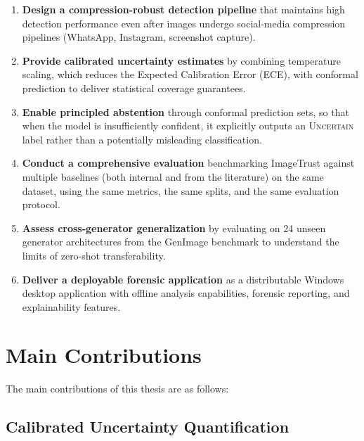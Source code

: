 \begin{enumerate}
    \item \textbf{Design a compression-robust detection pipeline} that maintains high detection performance even after images undergo social-media compression pipelines (WhatsApp, Instagram, screenshot capture).

    \item \textbf{Provide calibrated uncertainty estimates} by combining temperature scaling, which reduces the Expected Calibration Error (ECE), with conformal prediction \cite{vovk2005algorithmic} to deliver statistical coverage guarantees.

    \item \textbf{Enable principled abstention} through conformal prediction sets, so that when the model is insufficiently confident, it explicitly outputs an \textsc{Uncertain} label rather than a potentially misleading classification.

    \item \textbf{Conduct a comprehensive evaluation} benchmarking ImageTrust against multiple baselines (both internal and from the literature) on the same dataset, using the same metrics, the same splits, and the same evaluation protocol.

    \item \textbf{Assess cross-generator generalization} by evaluating on 24 unseen generator architectures from the GenImage benchmark \cite{zhu2024genimage} to understand the limits of zero-shot transferability.

    \item \textbf{Deliver a deployable forensic application} as a distributable Windows desktop application with offline analysis capabilities, forensic reporting, and explainability features.
\end{enumerate}


\section{Main Contributions}\label{sec:contributions}

The main contributions of this thesis are as follows:

\subsection{Calibrated Uncertainty Quantification}\label{sec:contrib-calibration}

